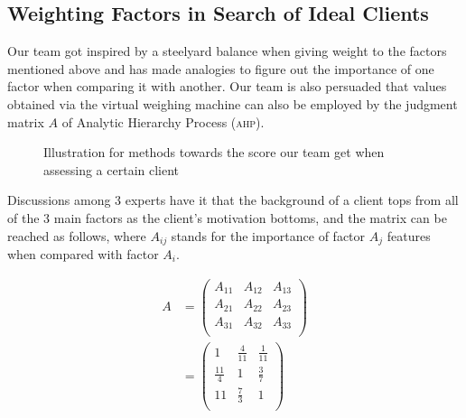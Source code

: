 \documentclass[12pt]{article}
\begin{document}
\subsection{Weighting Factors in Search of Ideal Clients}
Our team got inspired by a steelyard balance when giving weight to the factors mentioned above and has made analogies to figure out the importance of one factor when comparing it with another. Our team is also persuaded that values obtained via the virtual weighing machine can also be employed by the judgment matrix $A$ of Analytic Hierarchy Process (\textsc{ahp}).
\begin{figure}[htbp]
	\centering
	\caption{Illustration for methods towards the score our team get when assessing a certain client}
	\label{Steelyard analysis}
\end{figure}

Discussions among 3 experts have it that the background of a client tops from all of the 3 main factors as the client's motivation bottoms, and the matrix can be reached as follows, where $A_{ij}$ stands for the importance of factor $A_j$ features when compared with factor $A_i$.

\begin{equation}
\begin{aligned}
	A&=\begin{pmatrix}
		A_{11} &A_{12} &A_{13}\\
		A_{21} &A_{22} &A_{23}\\
		A_{31} &A_{32} &A_{33}\\
	\end{pmatrix}
	\\&=\begin{pmatrix}
		1 &\frac{4}{11} &\frac{1}{11}\\
		\frac{11}{4} &1 &\frac{3}{7}\\
		11&\frac{7}{3}&1\\
	\end{pmatrix}
	\end{aligned}
\end{equation}
\end{document}
